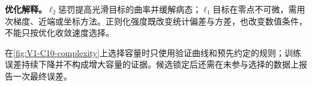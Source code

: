 \documentclass[UTF8,a4paper,11pt,openany]{ctexbook}
\begin{document}
\setcounter{page}{182}
\setcounter{chapter}{10}
\setcounter{figure}{0}
\pagestyle{headings}
\begin{optimizationbox}
\textbf{优化解释。}$\ell_2$惩罚提高光滑目标的曲率并缓解病态；$\ell_1$目标在零点不可微，需用次梯度、近端或坐标方法。正则化强度既改变统计偏差与方差，也改变数值条件，不能只按优化收敛速度选择。
\end{optimizationbox}
\begingroup
{}

\endgroup
在\cref{fig:V1-C10-complexity}上选择容量时只使用验证曲线和预先约定的规则；训练误差持续下降并不构成增大容量的证据。候选锁定后还需在未参与选择的数据上报告一次最终误差。
\end{document}

